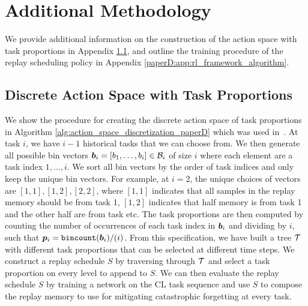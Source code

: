 
\section{Additional Methodology}\label{paperD:app:methodology}

We provide additional information on the construction of the action space with task proportions in Appendix \ref{paperD:app:action_space}, and outline the training procedure of the replay scheduling policy in Appendix \ref{paperD:app:rl_framework_algorithm}. 

\subsection{Discrete Action Space with Task Proportions}\label{paperD:app:action_space}

We show the procedure for creating the discrete action space of task proportions in Algorithm \ref{alg:action_space_discretization_paperD} which was used in~. At task $i$, we have $i-1$ historical tasks that we can choose from. We then generate all possible bin vectors ${\bm{b}}_i = [b_1, \dots, b_{i}] \in {\mathcal{B}}_i$ of size $i$ where each element are a task index $1, ..., i$. We sort all bin vectors by the order of task indices and only keep the unique bin vectors. For example, at $i=2$, the unique choices of vectors are $[1,1], [1,2], [2,2]$, where $[1,1]$ indicates that all samples in the replay memory should be from task 1, $[1,2]$ indicates that half memory is from task 1 and the other half are from task etc. The task proportions are then computed by counting the number of occurrences of each task index in ${\bm{b}}_i$ and dividing by $i$, such that ${\bm{p}}_i = \texttt{bincount}({\bm{b}}_i) / (i)$. From this specification, we have built a tree ${\mathcal{T}}$ with different task proportions that can be selected at different time steps. We construct a replay schedule $S$ by traversing through ${\mathcal{T}}$ and select a task proportion on every level to append to $S$. We can then evaluate the replay schedule $S$ by training a network on the CL task sequence and use $S$ to compose the replay memory to use for mitigating catastrophic forgetting at every task. 


